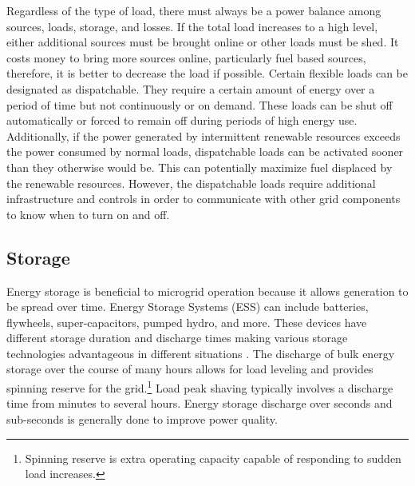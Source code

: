 Regardless of the type of load, there must always be a power balance among sources, loads, storage, and losses. If the total load increases to a high level, either additional sources must be brought online or other loads must be shed. It costs money to bring more sources online, particularly fuel based sources, therefore, it is better to decrease the load if possible. Certain flexible loads can be designated as dispatchable. They require a certain amount of energy over a period of time but not continuously or on demand. These loads can be shut off automatically or forced to remain off during periods of high energy use. Additionally, if the power generated by intermittent renewable resources exceeds the power consumed by normal loads, dispatchable loads can be activated sooner than they otherwise would be. This can potentially maximize fuel displaced by the renewable resources. However, the dispatchable loads require additional infrastructure and controls in order to communicate with other grid components to know when to turn on and off.

\subsection{Storage}
Energy storage is beneficial to microgrid operation because it allows generation to be spread over time. Energy Storage Systems (ESS) can include batteries, flywheels, super-capacitors, pumped hydro, and more. These devices have different storage duration and discharge times making various storage technologies advantageous in different situations \cite{Schoenung2003}. The discharge of bulk energy storage over the course of many hours allows for load leveling and provides spinning reserve for the grid.\footnote{Spinning reserve is extra operating capacity capable of responding to sudden load increases.} Load peak shaving typically involves a discharge time from minutes to several hours. Energy storage discharge over seconds and sub-seconds is generally done to improve power quality.


